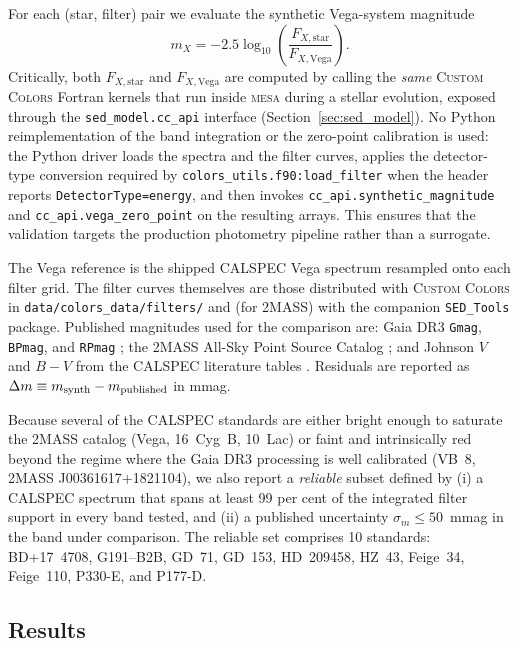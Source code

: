 For each (star, filter) pair we evaluate the synthetic Vega-system magnitude
\begin{equation}
    m_X = -2.5 \log_{10}\!\left(\frac{F_{X,\mathrm{star}}}{F_{X,\mathrm{Vega}}}\right).
\end{equation}
Critically, both $F_{X,\mathrm{star}}$ and $F_{X,\mathrm{Vega}}$ are computed
by calling the \emph{same} \textsc{Custom Colors} Fortran kernels that run
inside \textsc{mesa} during a stellar evolution, exposed through the
\texttt{sed\_model.cc\_api} interface
(Section~\ref{sec:sed_model}).  No Python reimplementation of the band
integration or the zero-point calibration is used: the Python driver loads the
spectra and the filter curves, applies the detector-type conversion required
by \texttt{colors\_utils.f90:load\_filter} when the header reports
\verb+DetectorType=energy+, and then invokes
\texttt{cc\_api.synthetic\_magnitude} and \texttt{cc\_api.vega\_zero\_point}
on the resulting arrays.  This ensures that the validation targets the
production photometry pipeline rather than a surrogate.

The Vega reference is the shipped CALSPEC Vega spectrum \citep{Bohlin2020}
resampled onto each filter grid.  The filter curves themselves are those
distributed with \textsc{Custom Colors} in
\texttt{data/colors\_data/filters/} and (for 2MASS) with the companion
\texttt{SED\_Tools} package.  Published magnitudes used for
the comparison are: Gaia DR3 \texttt{Gmag}, \texttt{BPmag}, and \texttt{RPmag}
\citep{GaiaDR3}; the 2MASS All-Sky Point Source Catalog
\citep{2mass_cutri}; and Johnson $V$ and $B-V$ from the CALSPEC literature
tables \citep{Bohlin2014, Bohlin2019}.  Residuals are reported as $\Delta m
\equiv m_{\rm synth} - m_{\rm published}$ in mmag.

Because several of the CALSPEC standards are either bright enough to saturate
the 2MASS catalog (Vega, 16~Cyg~B, 10~Lac) or faint and intrinsically red
beyond the regime where the Gaia DR3 processing is well calibrated (VB~8, 2MASS
J00361617+1821104), we also report a \emph{reliable} subset defined by (i) a
CALSPEC spectrum that spans at least 99 per cent of the integrated filter
support in every band tested, and (ii) a published uncertainty $\sigma_m \le
50$~mmag in the band under comparison.  The reliable set comprises 10
standards: BD+17~4708, G191--B2B, GD~71, GD~153, HD~209458, HZ~43, Feige~34,
Feige~110, P330-E, and P177-D.

\subsection{Results}

